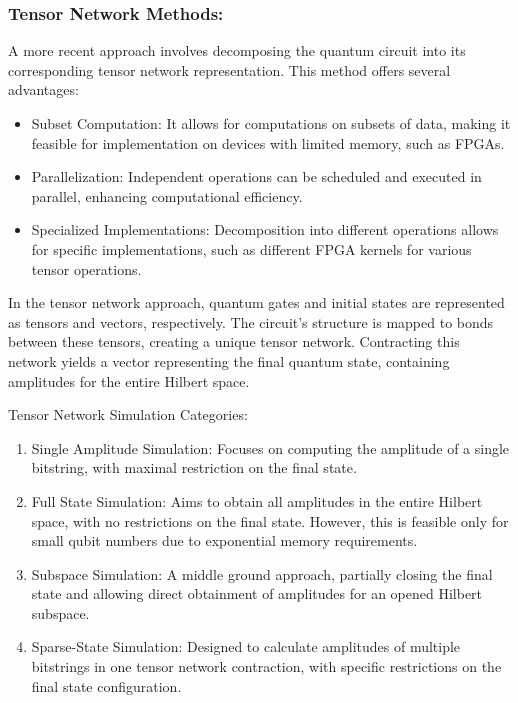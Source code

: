 \documentclass[12pt,oneside,a4paper]{article}
\begin{document}
\subsubsection{Tensor Network Methods:}
A more recent approach involves decomposing the quantum circuit into its corresponding tensor network representation. This method offers several advantages:

\begin{itemize}
    \item Subset Computation: It allows for computations on subsets of data, making it feasible for implementation on devices with limited memory, such as FPGAs.
    \item Parallelization: Independent operations can be scheduled and executed in parallel, enhancing computational efficiency.
    \item Specialized Implementations: Decomposition into different operations allows for specific implementations, such as different FPGA kernels for various tensor operations.
\end{itemize}

In the tensor network approach, quantum gates and initial states are represented as tensors and vectors, respectively. The circuit's structure is mapped to bonds between these tensors, creating a unique tensor network. Contracting this network yields a vector representing the final quantum state, containing amplitudes for the entire Hilbert space.

Tensor Network Simulation Categories:
\begin{enumerate}
    \item Single Amplitude Simulation: Focuses on computing the amplitude of a single bitstring, with maximal restriction on the final state.
    \item Full State Simulation: Aims to obtain all amplitudes in the entire Hilbert space, with no restrictions on the final state. However, this is feasible only for small qubit numbers due to exponential memory requirements.
    \item Subspace Simulation: A middle ground approach, partially closing the final state and allowing direct obtainment of amplitudes for an opened Hilbert subspace.
    \item Sparse-State Simulation: Designed to calculate amplitudes of multiple bitstrings in one tensor network contraction, with specific restrictions on the final state configuration.
\end{enumerate}
\end{document}
